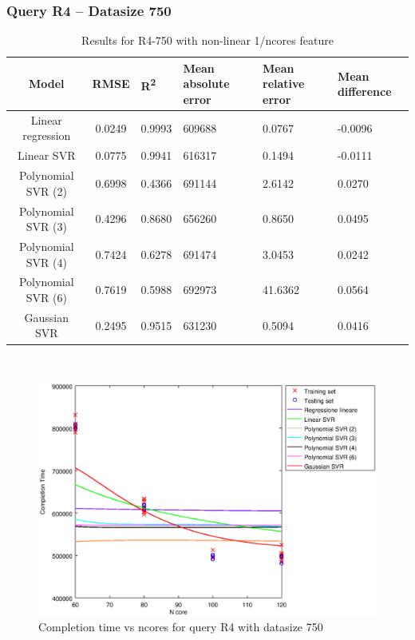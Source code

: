 \documentclass[a4paper,11pt]{article}
\begin{document}
\newpage
\subsubsection{Query R4 -- Datasize 750}
\begin{table}[H]
	\centering
	\begin{adjustbox}{center}
		\begin{tabular}{c | c M{1.2cm} M{2.5cm} M{2.5cm} M{1.8cm}}
			Model & RMSE & R\textsuperscript{2} & Mean absolute error & Mean relative error & Mean difference \tabularnewline
			\hline
			Linear regression & 0.0249 & 0.9993 & 609688 & 0.0767 & -0.0096 \\
			Linear SVR & 0.0775 & 0.9941 & 616317 & 0.1494 & -0.0111 \\
			Polynomial SVR (2) & 0.6998 & 0.4366 & 691144 & 2.6142 & 0.0270 \\
			Polynomial SVR (3) & 0.4296 & 0.8680 & 656260 & 0.8650 & 0.0495 \\
			Polynomial SVR (4) & 0.7424 & 0.6278 & 691474 & 3.0453 & 0.0242 \\
			Polynomial SVR (6) & 0.7619 & 0.5988 & 692973 & 41.6362 & 0.0564 \\
			Gaussian SVR & 0.2495 & 0.9515 & 631230 & 0.5094 & 0.0416 \\
		\end{tabular}
	\end{adjustbox}
	\\
	\caption{Results for R4-750 with non-linear 1/ncores feature}
	\label{table_R4_prediction_all}
\end{table}

\begin {figure}[hbtp]
\centering
\includegraphics[width=\textwidth]{output/R4_750_1_OVER_NCORES/plot_R4_750.eps}
\caption {Completion time vs ncores for query R4 with datasize 750}
\end {figure}
\end{document}
